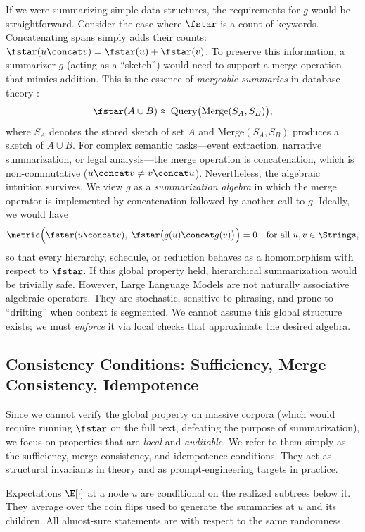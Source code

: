 If we were summarizing simple data structures, the requirements for $g$ would be straightforward. Consider the case where $\fstar$ is a count of keywords. Concatenating spans simply adds their counts: $\fstar(u \concat v) = \fstar(u) + \fstar(v)$. To preserve this information, a summarizer $g$ (acting as a ``sketch'') would need to support a merge operation that mimics addition. This is the essence of \emph{mergeable summaries} in database theory \citep{Agarwal2013MergeableTODS}:
\[
\fstar(A \cup B) \approx \text{Query}\big(\text{Merge}(S_A, S_B)\big),
\]
where $S_A$ denotes the stored sketch of set $A$ and $\text{Merge}(S_A,S_B)$ produces a sketch of $A\cup B$. For complex semantic tasks---event extraction, narrative summarization, or legal analysis---the merge operation is concatenation, which is non-commutative ($u \concat v \neq v \concat u$). Nevertheless, the algebraic intuition survives. We view $g$ as a \emph{summarization algebra} in which the merge operator is implemented by concatenation followed by another call to $g$. Ideally, we would have
\[
\metric\Big(\fstar(u \concat v), \;\fstar\big(g(u) \concat g(v)\big)\Big) = 0
\quad\text{for all }u,v\in\Strings,
\]
so that every hierarchy, schedule, or reduction behaves as a homomorphism with respect to $\fstar$. If this global property held, hierarchical summarization would be trivially safe. However, Large Language Models are not naturally associative algebraic operators. They are stochastic, sensitive to phrasing, and prone to ``drifting'' when context is segmented. We cannot assume this global structure exists; we must \emph{enforce} it via local checks that approximate the desired algebra.

\subsection{Consistency Conditions: Sufficiency, Merge Consistency, Idempotence}

Since we cannot verify the global property on massive corpora (which would require running $\fstar$ on the full text, defeating the purpose of summarization), we focus on properties that are \emph{local} and \emph{auditable}. We refer to them simply as the sufficiency, merge-consistency, and idempotence conditions. They act as structural invariants in theory and as prompt-engineering targets in practice.

\begin{convention}
Expectations $\E[\cdot]$ at a node $u$ are conditional on the realized subtrees below it. They average over the coin flips used to generate the summaries at $u$ and its children. All almost-sure statements are with respect to the same randomness.
\end{convention}

